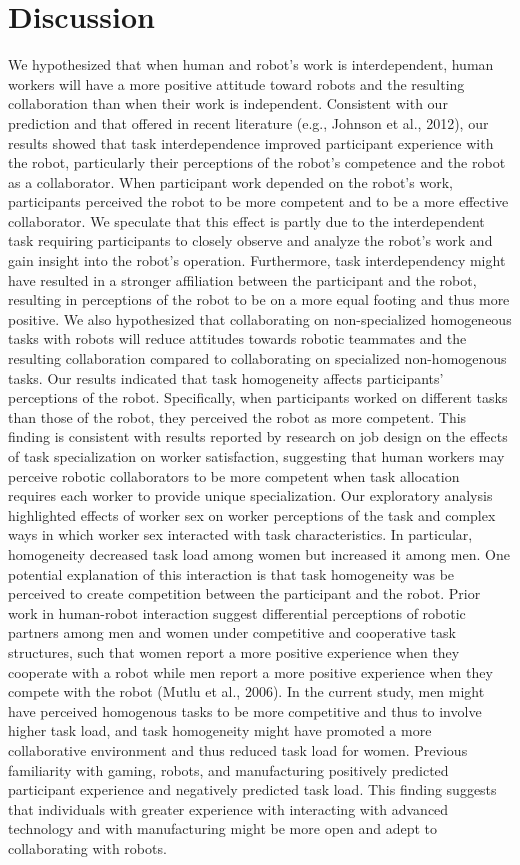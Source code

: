 \section{Discussion}
        We hypothesized that when human and robot’s work is interdependent, human workers will have a more positive attitude toward robots and the resulting collaboration than when their work is independent. Consistent with our prediction and that offered in recent literature (e.g., Johnson et al., 2012), our results showed that task interdependence improved participant experience with the robot, particularly their perceptions of the robot’s competence and the robot as a collaborator. When participant work depended on the robot’s work, participants perceived the robot to be more competent and to be a more effective collaborator. We speculate that this effect is partly due to the interdependent task requiring participants to closely observe and analyze the robot’s work and gain insight into the robot’s operation. Furthermore, task interdependency might have resulted in a stronger affiliation between the participant and the robot, resulting in perceptions of the robot to be on a more equal footing and thus more positive. 
       We also hypothesized that collaborating on non-specialized homogeneous tasks with robots will reduce attitudes towards robotic teammates and the resulting collaboration compared to collaborating on specialized non-homogenous tasks. Our results indicated that task homogeneity affects participants’ perceptions of the robot. Specifically, when participants worked on different tasks than those of the robot, they perceived the robot as more competent. This finding is consistent with results reported by research on job design on the effects of task specialization on worker satisfaction, suggesting that human workers may perceive robotic collaborators to be more competent when task allocation requires each worker to provide unique specialization.
       Our exploratory analysis highlighted effects of worker sex on worker perceptions of the task and complex ways in which worker sex interacted with task characteristics. In particular, homogeneity decreased task load among women but increased it among men. One potential explanation of this interaction is that task homogeneity was be perceived to create competition between the participant and the robot. Prior work in human-robot interaction suggest differential perceptions of robotic partners among men and women under competitive and cooperative task structures, such that women report a more positive experience when they cooperate with a robot while men report a more positive experience when they compete with the robot (Mutlu et al., 2006). In the current study, men might have perceived homogenous tasks to be more competitive and thus to involve higher task load, and task homogeneity might have promoted a more collaborative environment and thus reduced task load for women. 
       Previous familiarity with gaming, robots, and manufacturing positively predicted  participant experience and negatively predicted  task load. This finding suggests that individuals with greater experience with interacting with advanced technology and with manufacturing might be more open and adept to collaborating with robots. 